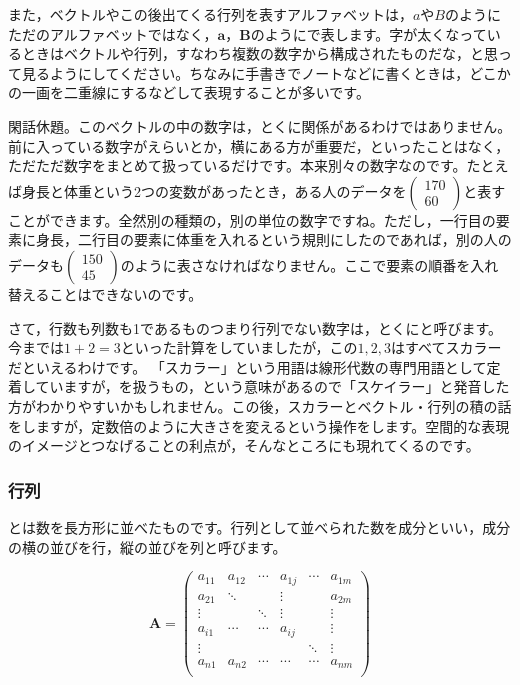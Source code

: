 \documentclass{ltjsbook}
\begin{document}
また，ベクトルやこの後出てくる行列を表すアルファベットは，$a$や$B$のようにただのアルファベットではなく，$\bm{a}$，$\bm{B}$のようにで表します。字が太くなっているときはベクトルや行列，すなわち複数の数字から構成されたものだな，と思って見るようにしてください。ちなみに手書きでノートなどに書くときは，どこかの一画を二重線にするなどして表現することが多いです。

閑話休題。このベクトルの中の数字は，とくに関係があるわけではありません。前に入っている数字がえらいとか，横にある方が重要だ，といったことはなく，ただただ数字をまとめて扱っているだけです。本来別々の数字なのです。たとえば身長と体重という2つの変数があったとき，ある人のデータを$ \begin{pmatrix} 170 \\ 60 \end{pmatrix} $と表すことができます。全然別の種類の，別の単位の数字ですね。ただし，一行目の要素に身長，二行目の要素に体重を入れるという規則にしたのであれば，別の人のデータも$\begin{pmatrix} 150 \\ 45 \end{pmatrix}$のように表さなければなりません。ここで要素の順番を入れ替えることはできないのです。

さて，行数も列数も1であるものつまり行列でない数字は，とくにと呼びます。今までは$1+2=3$といった計算をしていましたが，この$1,2,3$はすべてスカラーだといえるわけです。
「スカラー」という用語は線形代数の専門用語として定着していますが，を扱うもの，という意味があるので「スケイラー」と発音した方がわかりやすいかもしれません。この後，スカラーとベクトル・行列の積の話をしますが，定数倍のように大きさを変えるという操作をします。空間的な表現のイメージとつなげることの利点が，そんなところにも現れてくるのです。

\subsubsection{行列}
とは数を長方形に並べたものです。行列として並べられた数を成分といい，成分の横の並びを行，縦の並びを列と呼びます。

\begin{equation*}
	\bm{A}=
	\begin{pmatrix}
		a_{11} & a_{12} & \cdots & a_{1j} & \cdots & a_{1m} \\
		a_{21} & \ddots &        & \vdots &        & a_{2m} \\
		\vdots &        & \ddots & \vdots &        & \vdots \\
		a_{i1} & \cdots & \cdots & a_{ij} &        & \vdots \\
		\vdots &        &        &        & \ddots & \vdots \\
		a_{n1} & a_{n2} & \cdots & \cdots & \cdots & a_{nm} \\
	\end{pmatrix}
\end{equation*}
\end{document}
